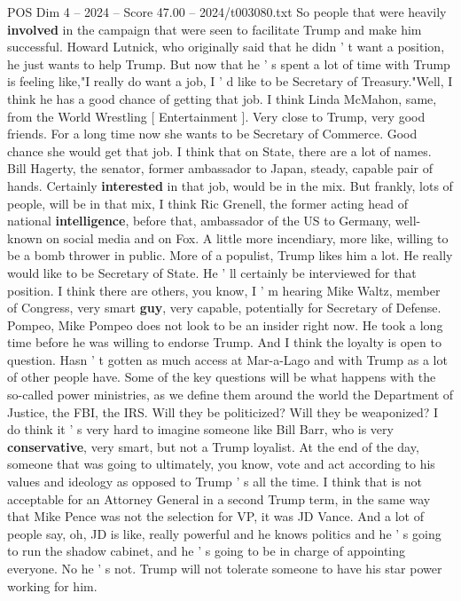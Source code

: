 \begin{textsample}{POS Dim 4 – 2024 – Score 47.00 – 2024/t003080.txt}
So people that were heavily \textbf{involved} in the campaign that were seen to facilitate Trump and make him successful.
Howard Lutnick, who originally said that he didn ' t want a position, he just wants to help Trump.
But now that he ' s spent a lot of time with Trump is feeling like,"I really do want a job, I ' d like to be Secretary of Treasury."Well, I think he has a good chance of getting that job.
I think Linda McMahon, same, from the World Wrestling [ Entertainment ].
Very close to Trump, very good friends.
For a long time now she wants to be Secretary of Commerce.
Good chance she would get that job.
I think that on State, there are a lot of names.
Bill Hagerty, the senator, former ambassador to Japan, steady, capable pair of hands.
Certainly \textbf{interested} in that job, would be in the mix.
But frankly, lots of people, will be in that mix, I think Ric Grenell, the former acting head of national \textbf{intelligence}, before that, ambassador of the US to Germany, well-known on social media and on Fox.
A little more incendiary, more like, willing to be a bomb thrower in public.
More of a populist, Trump likes him a lot.
He really would like to be Secretary of State.
He ' ll certainly be interviewed for that position.
I think there are others, you know, I ' m hearing Mike Waltz, member of Congress, very smart \textbf{guy}, very capable, potentially for Secretary of Defense.
Pompeo, Mike Pompeo does not look to be an insider right now.
He took a long time before he was willing to endorse Trump.
And I think the loyalty is open to question.
Hasn ' t gotten as much access at Mar-a-Lago and with Trump as a lot of other people have.
Some of the key questions will be what happens with the so-called power ministries, as we define them around the world the Department of Justice, the FBI, the IRS.
Will they be politicized?
Will they be weaponized?
I do think it ' s very hard to imagine someone like Bill Barr, who is very \textbf{conservative}, very smart, but not a Trump loyalist.
At the end of the day, someone that was going to ultimately, you know, vote and act according to his values and ideology as opposed to Trump ' s all the time.
I think that is not acceptable for an Attorney General in a second Trump term, in the same way that Mike Pence was not the selection for VP, it was JD Vance.
And a lot of people say, oh, JD is like, really powerful and he knows politics and he ' s going to run the shadow cabinet, and he ' s going to be in charge of appointing everyone.
No he ' s not.
Trump will not tolerate someone to have his star power working for him.

\end{textsample}
